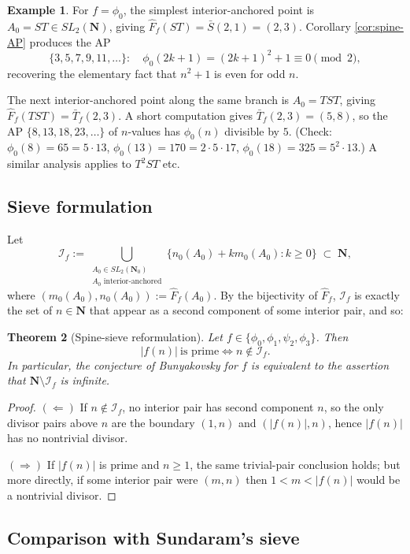 \documentclass[11pt]{article}
\newtheorem{theorem}{Theorem}[section]
\theoremstyle{definition}
\newtheorem{example}[theorem]{Example}
\newcommand{\N}{\mathbf{N}}
\newcommand{\Nz}{\mathbf{N}_0}
\newcommand{\SLNz}{SL_2(\Nz)}
\newcommand{\SLN}{SL_2(\N)}
\newcommand{\Sb}{\bar{S}}
\newcommand{\Tb}{\bar{T}_f}
\newcommand{\Ff}{\hat{F}_f}
\begin{document}
\begin{example}\label{ex:phi0-spine}
For $f = \phi_0$, the simplest interior-anchored point is $A_0 = ST \in \SLN$, giving $\Ff(ST) = \Sb(2,1) = (2,3)$. Corollary \ref{cor:spine-AP} produces the AP
\[
\{3,5,7,9,11,\dots\}: \quad \phi_0(2k+1) = (2k+1)^2 + 1 \equiv 0 \pmod 2,
\]
recovering the elementary fact that $n^2+1$ is even for odd $n$.

The next interior-anchored point along the same branch is $A_0 = TST$, giving $\Ff(TST) = \Tb(2,3)$. A short computation gives $\Tb(2,3) = (5,8)$, so the AP $\{8,13,18,23,\dots\}$ of $n$-values has $\phi_0(n)$ divisible by $5$. (Check: $\phi_0(8)=65=5\cdot 13$, $\phi_0(13)=170=2\cdot 5 \cdot 17$, $\phi_0(18) = 325 = 5^2 \cdot 13$.) A similar analysis applies to $T^2ST$ etc.
\end{example}

\subsection{Sieve formulation}

Let
\[
\mathcal{I}_f := \bigcup_{\substack{A_0 \in \SLNz \\ A_0 \text{ interior-anchored}}} \{n_0(A_0) + k m_0(A_0) : k \ge 0\} \;\subset\; \N,
\]
where $(m_0(A_0), n_0(A_0)) := \Ff(A_0)$. By the bijectivity of $\Ff$, $\mathcal{I}_f$ is exactly the set of $n \in \N$ that appear as a second component of some interior pair, and so:

\begin{theorem}[Spine-sieve reformulation]\label{thm:spine-sieve}
Let $f \in \{\phi_0,\phi_1,\psi_2,\phi_3\}$. Then
\[
|f(n)|\ \text{is prime} \iff n \notin \mathcal{I}_f.
\]
In particular, the conjecture of Bunyakovsky for $f$ is equivalent to the assertion that $\N \setminus \mathcal{I}_f$ is infinite.
\end{theorem}

\begin{proof}
$(\Leftarrow)$ If $n \notin \mathcal{I}_f$, no interior pair has second component $n$, so the only divisor pairs above $n$ are the boundary $(1,n)$ and $(|f(n)|,n)$, hence $|f(n)|$ has no nontrivial divisor.

$(\Rightarrow)$ If $|f(n)|$ is prime and $n \ge 1$, the same trivial-pair conclusion holds; but more directly, if some interior pair were $(m,n)$ then $1 < m < |f(n)|$ would be a nontrivial divisor.
\end{proof}

\subsection{Comparison with Sundaram's sieve}
\end{document}
